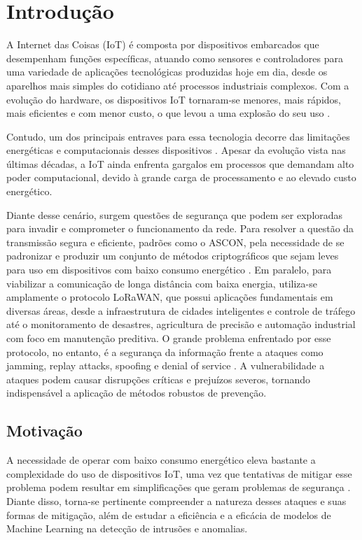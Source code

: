 \chapter{Introdução} \label{cap:introducao}

A Internet das Coisas (IoT) é composta por dispositivos embarcados que desempenham funções específicas, atuando como sensores e controladores para uma variedade de aplicações tecnológicas produzidas hoje em dia, desde os aparelhos mais simples do cotidiano até processos industriais complexos. Com a evolução do hardware, os dispositivos IoT tornaram-se menores, mais rápidos, mais eficientes e com menor custo, o que levou a uma explosão do seu uso \cite{alfuqaha2015iot}.

Contudo, um dos principais entraves para essa tecnologia decorre das limitações energéticas e computacionais desses dispositivos \cite{nistir8114}. Apesar da evolução vista nas últimas décadas, a IoT ainda enfrenta gargalos em processos que demandam alto poder computacional, devido à grande carga de processamento e ao elevado custo energético.

Diante desse cenário, surgem questões de segurança que podem ser exploradas para invadir e comprometer o funcionamento da rede. Para resolver a questão da transmissão segura e eficiente, padrões como o ASCON, pela necessidade de se padronizar e produzir um conjunto de métodos criptográficos que sejam leves para uso em dispositivos com baixo consumo energético \cite{nist800232}. Em paralelo, para viabilizar a comunicação de longa distância com baixa energia, utiliza-se amplamente o protocolo LoRaWAN, que possui aplicações fundamentais em diversas áreas, desde a infraestrutura de cidades inteligentes e controle de tráfego até o monitoramento de desastres, agricultura de precisão e automação industrial com foco em manutenção preditiva. O grande problema enfrentado por esse protocolo, no entanto, é a 
segurança da informação frente a ataques como jamming, replay attacks, 
spoofing e denial of service \cite{hessel2023lorawan}. A vulnerabilidade a ataques podem causar disrupções críticas e prejuízos severos, tornando indispensável a aplicação de métodos robustos de prevenção. 


\section{Motivação}
A necessidade de operar com baixo consumo energético eleva bastante a complexidade do uso de dispositivos IoT, uma vez que tentativas de mitigar esse problema podem resultar em simplificações que geram problemas de segurança \cite{nistir8114} \cite{hessel2023lorawan}. Diante disso, torna-se pertinente compreender a natureza desses ataques e suas formas de mitigação, além de estudar a eficiência e a eficácia de modelos de Machine Learning na detecção de intrusões e anomalias.

